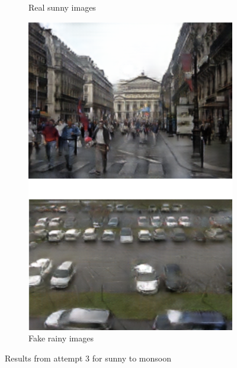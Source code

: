 \documentclass{article}
\begin{document}
\begin{figure}
\begin{subfigure}{.5\textwidth}
		\caption{Real sunny images}
	\end{subfigure}
	\begin{subfigure}{.5\textwidth}
		\centering
		\includegraphics[width=.9\linewidth]{images/v3_fake_B.png}
		\caption{Fake rainy images}
	\end{subfigure}
	\caption{Results from attempt 3 for sunny to monsoon}
	\label{fig:v3_good_AtoB}
\end{figure}
\end{document}

